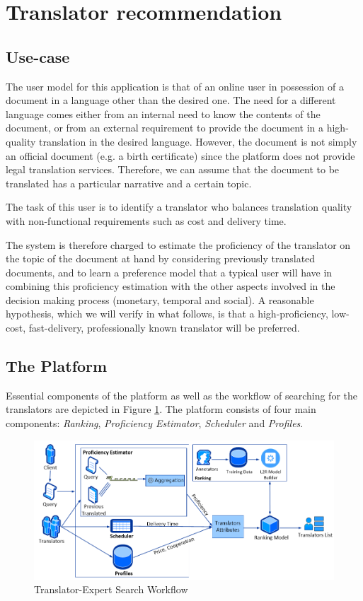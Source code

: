 \section{Translator recommendation}
\label{sec:casestudy}
\subsection{Use-case}\label{sec:usecase}
The user model for this application is that of an online user in possession of a document in a language other than the desired one. The need for a different language comes either from an internal need to know the contents of the document, or from an external requirement to provide the document in a high-quality translation in the desired language. However, the document is not simply an official document (e.g. a birth certificate) since the platform does not provide legal translation services. Therefore, we can assume that the document to be translated has a particular narrative and a certain topic. 

The task of this user is to identify a translator who balances translation quality with non-functional requirements such as cost and delivery time.  

The system is therefore charged to estimate the proficiency of the translator on the topic of the document at hand by considering previously translated documents, and to learn a preference model that a typical user will have in combining this proficiency estimation with the other aspects involved in the decision making process (monetary, temporal and social). A reasonable hypothesis, which we will verify in what follows, is that a high-proficiency, low-cost, fast-delivery, professionally known translator will be preferred. 

\subsection{The Platform}\label{sec:platform}
Essential components of the platform as well as the workflow of searching for the translators are depicted in Figure \ref{fig:architecture}. The platform consists of four main components: \textit{Ranking}, \textit{Proficiency Estimator}, \textit{Scheduler} and \textit{Profiles}.

\begin{figure}
\begin{center}
\includegraphics[width=12cm]{figures/dataflow.png}
\caption{Translator-Expert Search Workflow
\label{fig:architecture}}
\end{center}
\end{figure}

